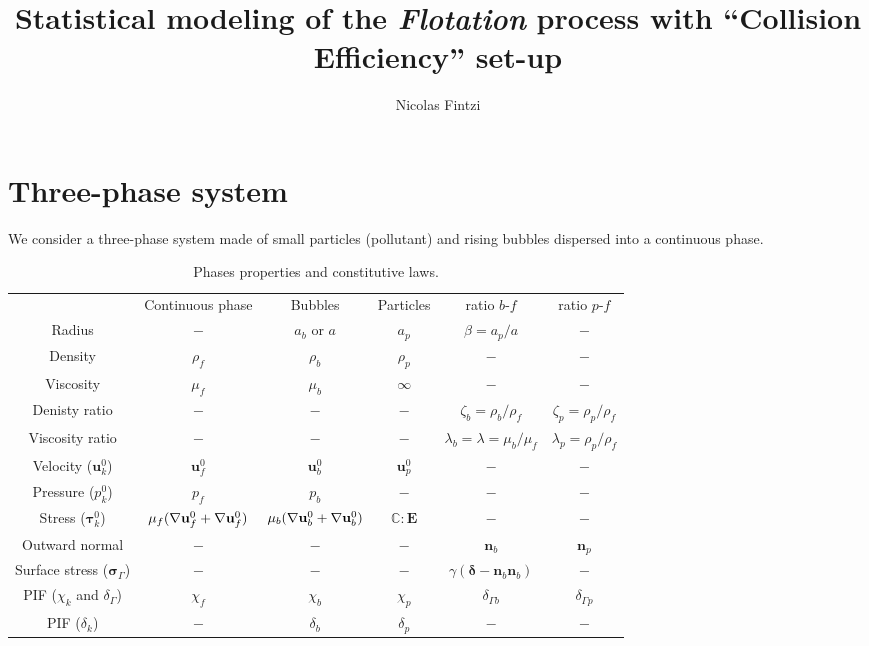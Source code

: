 \documentclass[12pt]{My_preprint}
\title{
    Statistical modeling of the \textit{Flotation} process with ``Collision Efficiency'' set-up 
    }
\author[1,2]{Nicolas Fintzi}
\begin{document}
\maketitle

\begin{abstract}
\end{abstract}

\section{Three-phase system}

We consider a three-phase system made of small particles (pollutant) and rising bubbles dispersed into a continuous phase. 

\begin{table}[h!]
    \centering
    \begin{tabular}{cccccc}
        & Continuous phase  & Bubbles   & Particles & ratio $b$-$f$                       & ratio $p$-$f$\\
        Radius         & $-$          & $a_b$ or $a$  & $a_p$  & $\beta = a_p /a$&$-$ \\
        Density         & $\rho_f$          & $\rho_b$  & $\rho_p$  & $-$&$-$ \\
        Viscosity       & $\mu_f$           & $\mu_b$   & $\infty$ &  $-$&$-$ \\
        Denisty ratio   &  $-$  &  $-$   &  $-$    & $\zeta_{b} = \rho_b/\rho_f$     & $\zeta_{p} = \rho_p/\rho_f$\\
        Viscosity ratio &  $-$  &  $-$   &  $-$    & $\lambda_{b}= \lambda = \mu_b/\mu_f$      & $\lambda_{p} = \rho_p/\rho_f$\\
        Velocity ($\textbf{u}_k^0$) &    $\textbf{u}_f^0$        &  $\textbf{u}_b^0$   &  $\textbf{u}_p^0$    &    $-$   & $-$\\
        Pressure ($p_k^0$) &    $p_f$ &  $p_b$   &   $-$&  $-$& $-$\\
        Stress ($\bm\tau_k^0$) &    $\mu_f (\mathbf{\nabla} \textbf{u}_f^0 + \mathbf{\nabla} \textbf{u}_f^0) $        & $\mu_b (\mathbf{\nabla} \textbf{u}_b^0 + \mathbf{\nabla} \textbf{u}_b^0) $    & $\mathbb{C}:\textbf{E}$&  $-$     &$-$ \\
        Outward normal &     $-$       &   $-$  &  $-$    & $\textbf{n}_b$      & $\textbf{n}_p$\\
        Surface stress ($\bm\sigma_\Gamma$) &   $-$         &  $-$   &   $-$   & $\gamma  (\bm\delta -\textbf{n}_b\textbf{n}_b)$    &$-$ \\
        PIF ($\chi_k$ and $\delta_{\Gamma}$) &$\chi_f$& $\chi_b$    &  $\chi_p$    &  $\delta_{\Gamma b}$  & $\delta_{\Gamma p}$  \\
        PIF ($\delta_k$) &$-$& $\delta_b$    &  $\delta_p$    & $-$  & $-$ 
    \end{tabular}
    \caption{Phases properties and constitutive laws.}
\end{table}
\end{document}
